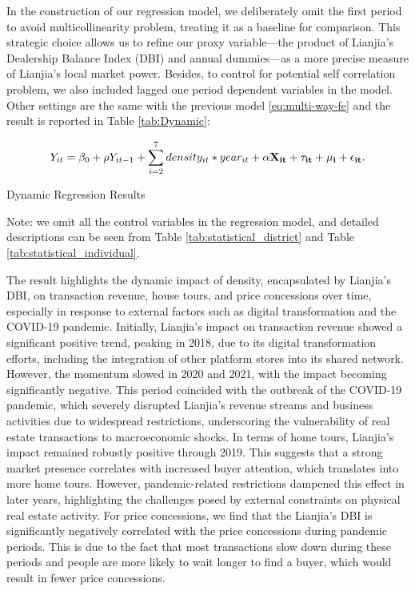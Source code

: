 \documentclass[11pt]{article}
\begin{document}
In the construction of our regression model, we deliberately omit the first period to avoid multicollinearity problem, treating it as a baseline for comparison. This strategic choice allows us to refine our proxy variable—the product of Lianjia's Dealership Balance Index (DBI) and annual dummies—as a more precise measure of Lianjia's local market power. Besides, to control for potential self correlation problem, we also included lagged one period dependent variables in the model.  Other settings are the same with the previous model \eqref{eq:multi-way-fe} and the result is reported in Table \ref{tab:Dynamic}: 

\begin{equation}
    Y_{it} = \beta_0 + \rho Y_{it-1} + \sum_{i=2}^7 density_{it} * year_{it} + \bf{\alpha} \bf{X}_{it} + \tau_{it} + \mu_i + \epsilon_{it}. \label{eq:dynamic}
\end{equation}

\begin{table}[H]
  \begin{center}
    \begin{scriptsize}
    \caption{Dynamic Regression Results}
    \label{tab:Dynamic}
    

    Note: we omit all the control variables in the regression model, and detailed descriptions can be seen from Table \ref{tab:statistical_district} and Table \ref{tab:statistical_individual}.
    \end{scriptsize}
  \end{center}
\end{table}

The result highlights the dynamic impact of density, encapsulated by Lianjia's DBI, on transaction revenue, house tours, and price concessions over time, especially in response to external factors such as digital transformation and the COVID-19 pandemic. Initially, Lianjia's impact on transaction revenue showed a significant positive trend, peaking in 2018, due to its digital transformation efforts, including the integration of other platform stores into its shared network. However, the momentum slowed in 2020 and 2021, with the impact becoming significantly negative. This period coincided with the outbreak of the COVID-19 pandemic, which severely disrupted Lianjia's revenue streams and business activities due to widespread restrictions, underscoring the vulnerability of real estate transactions to macroeconomic shocks. In terms of home tours, Lianjia's impact remained robustly positive through 2019. This suggests that a strong market presence correlates with increased buyer attention, which translates into more home tours. However, pandemic-related restrictions dampened this effect in later years, highlighting the challenges posed by external constraints on physical real estate activity. For price concessions, we find that the Lianjia's DBI is significantly negatively correlated with the price concessions during pandemic periods. This is due to the fact that most transactions slow down during these periods and people are more likely to wait longer to find a buyer, which would result in fewer price concessions.
\end{document}
